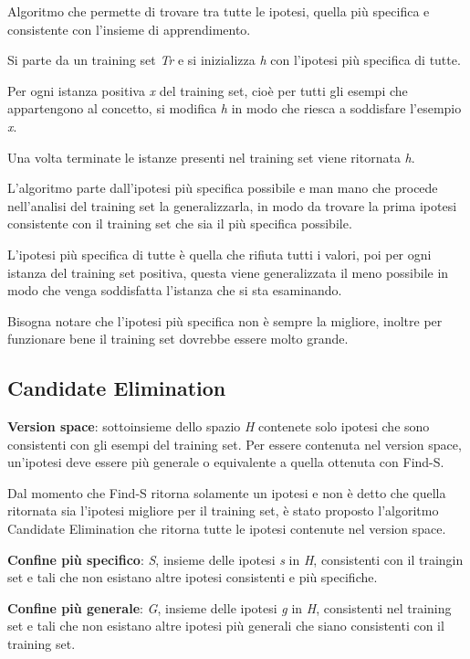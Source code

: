 Algoritmo che permette di trovare tra tutte le ipotesi, quella più
specifica e consistente con l'insieme di apprendimento.

Si parte da un training set \emph{Tr} e si inizializza \emph{h} con
l'ipotesi più specifica di tutte.

Per ogni istanza positiva \emph{x} del training set, cioè per tutti gli
esempi che appartengono al concetto, si modifica \emph{h} in modo che
riesca a soddisfare l'esempio \emph{x}.

Una volta terminate le istanze presenti nel training set viene ritornata
\emph{h}.

L'algoritmo parte dall'ipotesi più specifica possibile e man mano che
procede nell'analisi del training set la generalizzarla, in modo da
trovare la prima ipotesi consistente con il training set che sia il più
specifica possibile.

L'ipotesi più specifica di tutte è quella che rifiuta tutti i valori,
poi per ogni istanza del training set positiva, questa viene
generalizzata il meno possibile in modo che venga soddisfatta l'istanza
che si sta esaminando.

Bisogna notare che l'ipotesi più specifica non è sempre la migliore,
inoltre per funzionare bene il training set dovrebbe essere molto
grande.

\subsection{Candidate Elimination}\label{candidate-elimination}

\textbf{Version space}: sottoinsieme dello spazio \emph{H} contenete
solo ipotesi che sono consistenti con gli esempi del training set. Per
essere contenuta nel version space, un'ipotesi deve essere più generale
o equivalente a quella ottenuta con Find-S.

Dal momento che Find-S ritorna solamente un ipotesi e non è detto che
quella ritornata sia l'ipotesi migliore per il training set, è stato
proposto l'algoritmo Candidate Elimination che ritorna tutte le ipotesi
contenute nel version space.

\textbf{Confine più specifico}: \emph{S}, insieme delle ipotesi \emph{s}
in \emph{H}, consistenti con il traingin set e tali che non esistano
altre ipotesi consistenti e più specifiche.

\textbf{Confine più generale}: \emph{G}, insieme delle ipotesi \emph{g}
in \emph{H}, consistenti nel training set e tali che non esistano altre
ipotesi più generali che siano consistenti con il training set.

